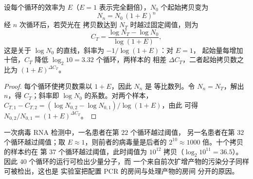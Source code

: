 \begin{theorem}[扩增的数量关系]\label{thm:b3:genetic-engineering:pcr}
设每个循环的效率为 $E$（$E = 1$ 表示完全翻倍），$N_{0}$
个起始拷贝变为
\[
N_{n} = N_{0}\,(1 + E)^{n}
\]
经 $n$ 次循环后，若荧光在
拷贝数达到 $N_{T}$ 时越过固定阈值，则\emph{}为
\[
C_{T} = \frac{\log N_{T} - \log N_{0}}{\log(1 + E)},
\]
这是关于 $\log N_{0}$ 的直线，斜率为 $-1/\log(1+E)$：对 $E = 1$，
起始量每增加十倍，$C_{T}$ 降低
$\log_{2} 10 = 3.32$ 个循环，两样本的
相差 $\Delta C_{T}$，二者起始拷贝数之比为
$(1 + E)^{\Delta C_{T}}$。
\end{theorem}
\begin{proof}
每个循环使拷贝数乘以 $1 + E$，因此 $N_{n}$ 是
等比数列。令 $N_{n} = N_{T}$，解出 $n$，得
$C_{T}$；斜率即 $\log N_{0}$ 的系数。对两个样本，
$C_{T,1} - C_{T,2} = (\log N_{0,2} - \log N_{0,1})/\log(1+E)$，由此
可得 $N_{0,2}/N_{0,1} = (1+E)^{\Delta C_{T}}$。
\end{proof}

\begin{example}\label{ex:b3:genetic-engineering:qpcr}
一次病毒 RNA 检测中，一名患者在第 $22$ 个循环越过阈值，
另一名患者在第 $32$ 个循环越过阈值；取 $E \approx 1$，则前者的病毒量是后者的 $2^{10}
\approx 1000$ 倍。十个拷贝的样本约在
第 $37$ 个循环越过阈值，此时阈值为 $10^{12}$ 拷贝（$\log_{2} 10^{11} =
36.5$）。因此 $40$ 个循环的运行可检出少量分子，而
一个来自前次扩增产物的污染分子同样可被检出，这也是
实验室把配置 PCR 的房间与处理产物的房间
分开的原因。
\end{example}

